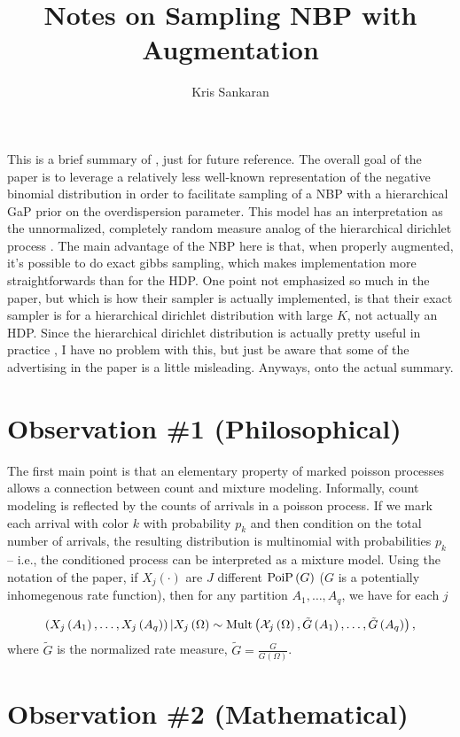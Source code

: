 \documentclass{article}
\title{Notes on Sampling NBP with Augmentation}
\author{Kris Sankaran}
\begin{document}
This is a brief summary of \citep{zhou2012augment}, just for future reference.
The overall goal of the paper is to leverage a relatively less well-known
representation of the negative binomial distribution in order to facilitate
sampling of a NBP with a hierarchical GaP prior on the overdispersion parameter.
This model has an interpretation as the unnormalized, completely random measure
analog of the hierarchical dirichlet process \citep{teh2005sharing}. The main
advantage of the NBP here is that, when properly augmented, it's possible to do
exact gibbs sampling, which makes implementation more straightforwards than for
the HDP. One point not emphasized so much in the paper, but which is how their
sampler is actually implemented, is that their exact sampler is for a
hierarchical dirichlet distribution with large $K$, not actually an HDP. Since
the hierarchical dirichlet distribution is actually pretty useful in practice
\citep{wallach2006topic}, I have no problem with this, but just be aware that
some of the advertising in the paper is a little misleading. Anyways, onto the
actual summary.

\section{Observation \#1 (Philosophical)}

The first main point is that an elementary property of marked poisson processes
allows a connection between count and mixture modeling. Informally, count
modeling is reflected by the counts of arrivals in a poisson process. If we mark
each arrival with color $k$ with probability $p_{k}$ and then condition on the
total number of arrivals, the resulting distribution is multinomial with
probabilities $p_{k}$ -- i.e., the conditioned process can be interpreted as a
mixture model. Using the notation of the paper, if $X_{j}\left(\cdot\right)$ are
$J$ different $\textnormal{PoiP}\left(G\right)$ ($G$ is a potentially inhomegenous rate
function), then for any partition $A_{1}, \dots, A_{q}$, we have for each $j$

\begin{align}
  \left(X_{j}\left(A_{1}\right), \dots, X_{j}\left(A_{q}\right)\right) \vert X_{j}\left(\Omega\right) \sim \textnormal{Mult}\left(\mathcal{X}_{j}\left(\Omega\right), \tilde{G}\left(A_{1}\right), \dots, \tilde{G}\left(A_{q}\right)\right),
\end{align}
where $\tilde{G}$ is the normalized rate measure, $\tilde{G} =
\frac{G}{G\left(\Omega\right)}$.

\section{Observation \#2 (Mathematical)}
\end{document}
